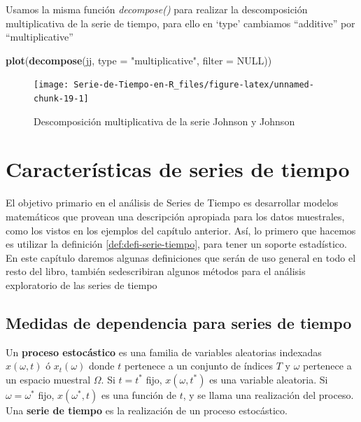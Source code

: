 \documentclass[12pt,]{krantz}
\makeatletter
\newenvironment{Shaded}{\begin{snugshade}}{\end{snugshade}}
\newcommand{\KeywordTok}[1]{\textcolor[rgb]{0.13,0.29,0.53}{\textbf{#1}}}
\newcommand{\DataTypeTok}[1]{\textcolor[rgb]{0.13,0.29,0.53}{#1}}
\newcommand{\StringTok}[1]{\textcolor[rgb]{0.31,0.60,0.02}{#1}}
\newcommand{\OtherTok}[1]{\textcolor[rgb]{0.56,0.35,0.01}{#1}}
\newcommand{\NormalTok}[1]{#1}
\newenvironment{kframe}{%
\medskip{}
\setlength{\fboxsep}{.8em}
 \def\at@end@of@kframe{}%
 \ifinner\ifhmode%
  \def\at@end@of@kframe{\end{minipage}}%
  \begin{minipage}{\columnwidth}%
 \fi\fi%
 \def\FrameCommand##1{\hskip\@totalleftmargin \hskip-\fboxsep
 \colorbox{shadecolor}{##1}\hskip-\fboxsep
     \hskip-\linewidth \hskip-\@totalleftmargin \hskip\columnwidth}%
 \MakeFramed {\advance\hsize-\width
   \@totalleftmargin\z@ \linewidth\hsize
   \@setminipage}}%
 {\par\unskip\endMakeFramed%
 \at@end@of@kframe}
\renewenvironment{Shaded}{\begin{kframe}}{\end{kframe}}
\theoremstyle{definition}
\theoremstyle{definition}
\theoremstyle{definition}
\theoremstyle{remark}
\let\BeginKnitrBlock\begin \let\EndKnitrBlock\end
\makeatother
\begin{document}
Usamos la misma función \emph{decompose()} para realizar la
descomposición multiplicativa de la serie de tiempo, para ello en `type'
cambiamos ``additive'' por ``multiplicative''

\begin{Shaded}
\begin{Highlighting}[]
\KeywordTok{plot}\NormalTok{(}\KeywordTok{decompose}\NormalTok{(jj, }\DataTypeTok{type =} \StringTok{"multiplicative"}\NormalTok{, }\DataTypeTok{filter =} \OtherTok{NULL}\NormalTok{))}
\end{Highlighting}
\end{Shaded}

\begin{figure}

{\centering \texttt{[image: Serie-de-Tiempo-en-R\_files/figure-latex/unnamed-chunk-19-1]} 

}

\caption{Descomposición multiplicativa de la serie Johnson y Johnson}\label{fig:unnamed-chunk-19}
\end{figure}

\chapter{Características de series de
tiempo}\label{caracteristicas-de-series-de-tiempo}

El objetivo primario en el análisis de Series de Tiempo es desarrollar
modelos matemáticos que provean una descripción apropiada para los datos
muestrales, como los vistos en los ejemplos del capítulo anterior. Así,
lo primero que hacemos es utilizar la definición
\ref{def:defi-serie-tiempo}, para tener un soporte estadístico. En este
capítulo daremos algunas definiciones que serán de uso general en todo
el resto del libro, también sedescribiran algunos métodos para el
análisis exploratorio de las series de tiempo

\section{Medidas de dependencia para series de
tiempo}\label{medidas-de-dependencia-para-series-de-tiempo}

\BeginKnitrBlock{definition}
\protect\hypertarget{def:defi-proceso-estocastico}{}{\label{def:defi-proceso-estocastico}
}Un \textbf{proceso estocástico} es una familia de variables aleatorias
indexadas \(x(\omega,t)\) ó \(x_t(\omega)\) donde \(t\) pertenece a un
conjunto de índices \(T\) y \(\omega\) pertenece a un espacio muestral
\(\Omega\). Si \(t=t^*\) fijo, \(x(\omega,t^*)\) es una variable
aleatoria. Si \(\omega=\omega^*\) fijo, \(x(\omega^*,t)\) es una función
de \(t\), y se llama una realización del proceso. Una \textbf{serie de
tiempo} es la realización de un proceso estocástico.
\EndKnitrBlock{definition}
\end{document}
